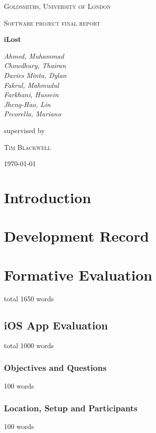 \documentclass[12pt,a4paper]{article}
\begin{document}
    \begin{titlepage}
      \centering
      {\scshape\LARGE Goldsmiths, University of London \par}
      \vspace{1cm}
      {\scshape\Large Software project final report\par}
      \vspace{1.5cm}
      {\huge\bfseries iLost\par}
      \vspace{2cm}
      {\Large\itshape 
        Ahmed, Muhammad\\
        Chowdhury, Thairan\\
        Davies Minta, Dylan\\     
        Fakrul, Mahmudul\\    
        Farkhani, Hussein\\ 
        Jheng-Hao, Lin\\
        Pecorella, Mariano\\ \par}
      \vfill
      supervised by\par
      \textsc{Tim Blackwell} 
      \vfill
      {\large \today \par}
    \end{titlepage}

    \tableofcontents
    \newpage

    \section{Introduction}
    \section{Development Record}
    \section{Formative Evaluation}
      total 1650 words
      \subsection{iOS App Evaluation} 
          total 1000 words
        \subsubsection{Objectives and Questions}
          100 words
        \subsubsection{Location, Setup and Participants}
          100 words
\end{document}
